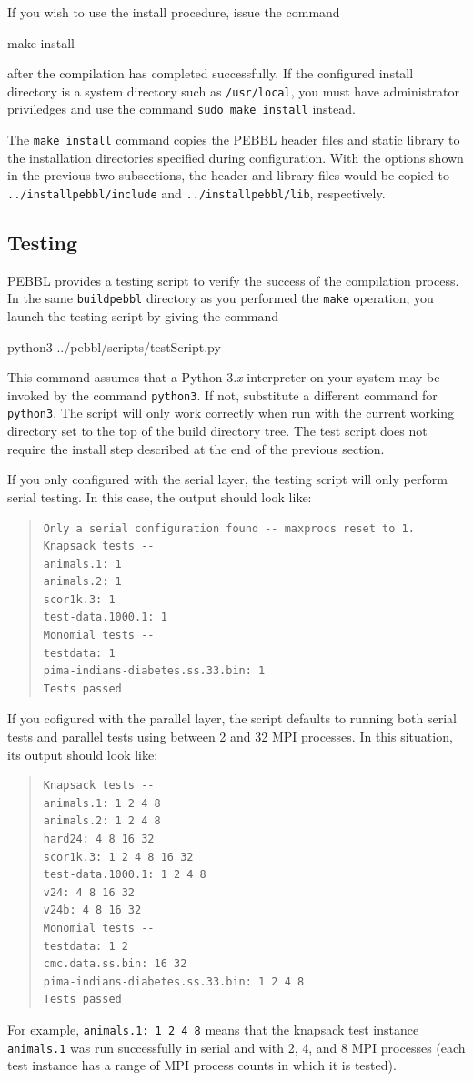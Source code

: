 If you wish to use the install procedure, issue the command 
\begin{codeblock}
make install
\end{codeblock}
after the compilation has completed successfully.  If the configured install
directory is a system directory such as \texttt{/usr/local}, you must have
administrator priviledges and use the command \texttt{sudo make install}
instead.

The \texttt{make install} command copies the PEBBL header files and static 
library to the installation directories specified during configuration.  With
the options shown in the previous two subsections, the header and library
files would be copied to \texttt{../installpebbl/include} and
\texttt{../installpebbl/lib}, respectively.

\subsection{Testing}
\label{sec:test}
PEBBL provides a testing script to verify the success of the compilation
process.  In the same \texttt{buildpebbl} directory as you performed the
\texttt{make} operation, you launch the testing script by giving the command
\begin{codeblock}
python3 ../pebbl/scripts/testScript.py
\end{codeblock}
This command assumes that a Python 3.\emph{x} interpreter on your system may
be invoked by the command \texttt{python3}.  If not, substitute a different
command for \texttt{python3}. The script will only work correctly when run
with the current working directory set to the top of the build directory tree.
The test script does not require the install step described at the end of the
previous section.

If you only configured with the serial layer, the testing script will only
perform serial testing.  In this case, the output should look like:
\begin{quote}
\begin{verbatim}
Only a serial configuration found -- maxprocs reset to 1.
Knapsack tests --
animals.1: 1
animals.2: 1
scor1k.3: 1
test-data.1000.1: 1
Monomial tests --
testdata: 1
pima-indians-diabetes.ss.33.bin: 1
Tests passed
\end{verbatim}
\end{quote}
If you cofigured with the parallel layer, the script defaults to running both
serial tests and parallel tests using between 2 and 32 MPI processes.  In this
situation, its output should look like:
\begin{quote}
\begin{verbatim}
Knapsack tests --
animals.1: 1 2 4 8
animals.2: 1 2 4 8
hard24: 4 8 16 32
scor1k.3: 1 2 4 8 16 32
test-data.1000.1: 1 2 4 8
v24: 4 8 16 32
v24b: 4 8 16 32
Monomial tests --
testdata: 1 2
cmc.data.ss.bin: 16 32
pima-indians-diabetes.ss.33.bin: 1 2 4 8
Tests passed
\end{verbatim}
\end{quote}
For example, \texttt{animals.1:~1 2 4 8} means that the knapsack test instance
\texttt{animals.1} was run successfully in serial and with 2, 4, and 8 MPI
processes (each test instance has a range of MPI process counts in which it
is tested).

